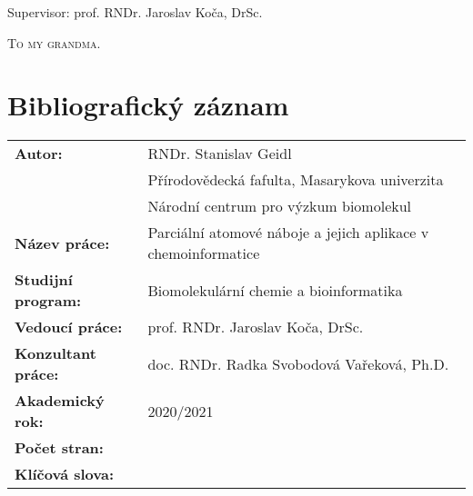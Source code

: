 \documentclass[11pt,b5paper,oneside,final]{book}
\begin{document}
\vspace*{9mm}

\begin{center}
  \fontsize{18pt}{18pt}Supervisor: prof. RNDr. Jaroslav Koča, DrSc.
\end{center}

\vfill


\begin{center}
    {\fontsize{20pt}{28pt}\selectfont{Brno 2021}} 
\end{center}
\normalsize
\clearpage

\begin{center}
\vspace*{10cm}
\textsc{To my grandma.}
\end{center}
\normalsize
\clearpage

\vfill
\section*{Bibliografický záznam}
\def\arraystretch{1.5}
\begin{tabular}{ ll } 
  \textbf{Autor:}            & RNDr. Stanislav Geidl \\
                             & Přírodovědecká fafulta, Masarykova univerzita \\
                             & Národní centrum pro výzkum biomolekul \\
  \textbf{Název práce:}      & Parciální atomové náboje a jejich aplikace v chemoinformatice \\ 
  \textbf{Studijní program:} & Biomolekulární chemie a bioinformatika \\
  \textbf{Vedoucí práce:}    & prof. RNDr. Jaroslav Koča, DrSc. \\
  \textbf{Konzultant práce:} & doc. RNDr. Radka Svobodová Vařeková, Ph.D. \\
  \textbf{Akademický rok:}   & 2020/2021 \\
  \textbf{Počet stran:}      & \\
  \textbf{Klíčová slova:}    & \\
\end{tabular}
\normalsize
\clearpage

\vfill
\end{document}

